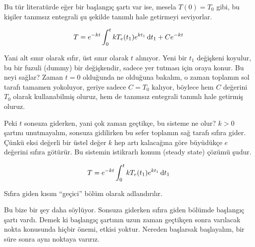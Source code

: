 \documentclass[12pt,fleqn]{article}\usepackage{../../common}
\begin{document}
Bu tür literatürde eğer bir başlangıç şartı var ise, mesela $T(0) = T_0$
gibi, bu kişiler tanımsız entegrali şu şekilde tanımlı hale getirmeyi
seviyorlar.

$$ T = e^{-kt} \int_0^t kT_e(t_1) e^{kt_1} \,\mathrm{d} t_1 + C e^{-kt} $$

Yani alt sınır olarak sıfır, üst sınır olarak $t$ alınıyor. Yeni bir $t_1$
değişkeni koyulur, bu bir fuzuli (dummy) bir değişkendir, sadece yer
tutması için oraya konur. Bu neyi sağlar? Zaman $t=0$ olduğunda ne olduğuna
bakalım, o zaman toplamın sol tarafı tamamen yokoluyor, geriye sadece
$C = T_0$ kalıyor, böylece hem $C$ değerini $T_0$ olarak kullanabilmiş
oluruz, hem de tanımsız entegrali tanımlı hale getirmiş oluruz.

Peki $t$ sonsuza giderken, yani çok zaman geçtikçe, bu sisteme ne olur?
$k > 0$ şartını unutmayalım, sonsuza gidilirken bu sefer toplamın sağ
tarafı sıfıra gider. Çünkü eksi değerli bir üstel değer $k$ hep artı
kalacağına göre büyüdükçe $e$ değerini sıfıra götürür. Bu sistemin
istikrarlı konum (steady state) çözümü şudur.

$$ T = e^{-kt} \int_0^t kT_e(t_1) e^{kt_1} \,\mathrm{d} t_1 $$

Sıfıra giden kısım ``geçici'' bölüm olarak adlandırılır.

Bu bize bir şey daha söylüyor. Sonsuza giderken sıfıra giden bölümde
başlangıç şartı vardı. Demek ki başlangıç şartının uzun zaman geçtikçen
sonra varılacak nokta konusunda hiçbir önemi, etkisi yoktur. Nereden
başlarsak başlayalım, bir süre sonra aynı noktaya varırız.
\end{document}
